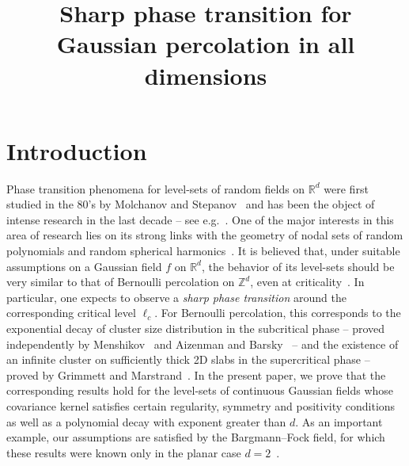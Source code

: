 \documentclass[AHL,Unicode,longabstracts,published]{cedram}
\title[Sharpness for Gaussian percolation]{Sharp phase transition for Gaussian percolation in all dimensions}
\author[\initial{F.} \lastname{Severo}]{\firstname{Franco} \lastname{Severo}}
\newcommand{\R}{\mathbb{R}}
\newcommand{\Z}{\mathbb{Z}}
\newcommand{\R}{\mathbb{R}}
\newcommand{\Z}{\mathbb{Z}}
\begin{document}
\maketitle

\section{Introduction}\label{sec:intro}

Phase transition phenomena for level-sets of random fields on $\R^d$ were first studied in the 80's by Molchanov and Stepanov~\cite{MoSt83a, MoSt83b, MoSt86c} and has been the object of intense research in the last decade -- see e.g.~\cite{BG17, BM18,MV, MRV20,RVb}. One of the major interests in this area of research lies on its strong links with the geometry of nodal sets of random polynomials and random spherical harmonics~\cite{An16, NaSo09, CaSa19, Sa1, SaWi19}. It is believed that, under suitable assumptions on a Gaussian field $f$ on $\R^d$, the behavior of its level-sets should be very similar to that of Bernoulli percolation on $\Z^d$, even at criticality~\cite{BogSch02,BogSch07}. In particular, one expects to observe a \emph{sharp phase transition} around the corresponding critical level $\ell_c$. For Bernoulli percolation, this corresponds to the exponential decay of cluster size distribution in the subcritical phase -- proved independently by Menshikov~\cite{Men86} and Aizenman and Barsky~\cite{AizBar87} -- and the existence of an infinite cluster on sufficiently thick 2D slabs in the supercritical phase -- proved by Grimmett and Marstrand~\cite{GriMar90}. In the present paper, we prove that the corresponding results hold for the level-sets of continuous Gaussian fields whose covariance kernel satisfies certain regularity, symmetry and positivity conditions as well as a polynomial decay with exponent greater than $d$. As an important example, our assumptions are satisfied by the Bargmann--Fock field, for which these results were known only in the planar case $d=2$~\cite{RVb}.
\end{document}
